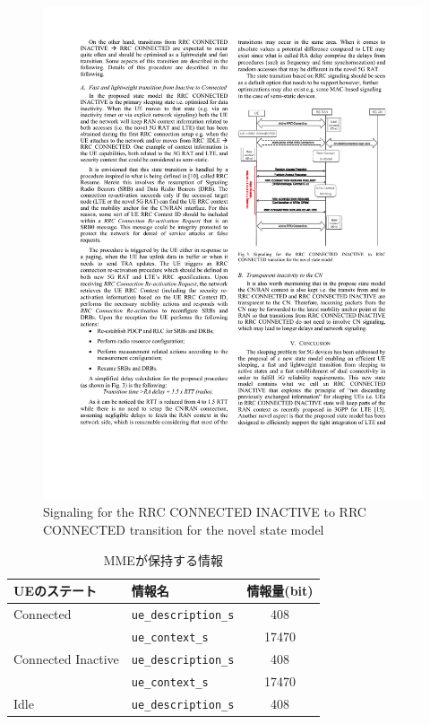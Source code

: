 \documentclass[a4j]{ujarticle}
\begin{document}
\begin{figure}[htbp]
  \centering
  \includegraphics[width=0.9\hsize]{Signaling_for_the_RRC_CONNECTED_INACTIVE_to_RRC_CONNECTED_transition_for_the_novel_state_model.pdf}
  \caption{Signaling for the RRC CONNECTED INACTIVE to RRC CONNECTED transition for the novel state model}
  \label{Signaling_for_the_RRC_CONNECTED_INACTIVE_to_RRC_CONNECTED_transition_for_the_novel_state_model}
\end{figure}

\begin{table}[htbp]
  \centering
  \caption{MMEが保持する情報}
  \label{table:OAI_mme_memory}
  \begin{tabular}{l|l|c}
    \hline
    UEのステート  & 情報名 & 情報量(bit)  \\ \hline \hline
    Connected & \verb|ue_description_s| & 408 \\
    & \verb|ue_context_s| & 17470\\\hline
    Connected Inactive & \verb|ue_description_s| & 408 \\
    & \verb|ue_context_s| & 17470\\\hline
    Idle & \verb|ue_description_s| & 408 \\
  \end{tabular}
\end{table}
\end{document}
